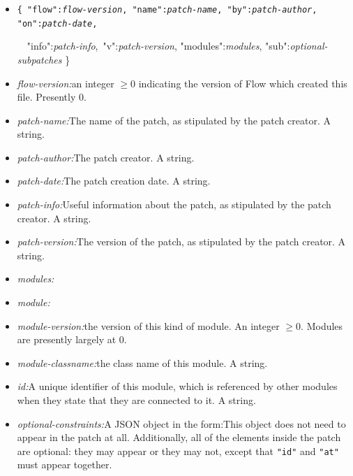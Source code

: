 \documentclass{article}
\begin{document}
\begin{itemize}
\item {\tt \{  "flow":{\it flow-version}, "name":{\it patch-name}, "by":{\it patch-author}, "on":{\it patch-date}, \rule[0in]{0in}{0in}~\hspace{\fill}\hbox{ "info":{\it patch-info}, "v":{\it patch-version},}  "modules":{\it modules}, "sub":{\it optional-subpatches} \} }
\item {\it flow-version:}\quad an integer \(\geq 0\) indicating the version of Flow which created this file.  Presently 0. 
\item {\it patch-name:}\quad The name of the patch, as stipulated by the patch creator.  A string. 
\item {\it patch-author:}\quad The patch creator.  A string.  
\item {\it patch-date:}\quad The patch creation date.  A string.  
\item {\it patch-info:}\quad Useful information about the patch, as stipulated by the patch creator.  A string.  
\item {\it patch-version:}\quad The version of the patch, as stipulated by the patch creator.  A string. 
\item {\it modules:}\quad {\tt [ {\it module,*} ] }
\item {\it module:}
\item {\it module-version:}\quad the version of this kind of module.  An integer \(\geq 0\).  Modules are presently largely at 0.
\item {\it module-classname:}\quad the class name of this module.  A string.
\item {\it id:}\quad A unique identifier of this module, which is referenced by other modules when they state that they are connected to it.  A string.
\item {\it optional-constraints:}\quad A JSON object in the form:\quad  This object does not need to appear in the patch at all.  Additionally, all of the elements inside the patch are optional: they may appear or they may not, except that {\tt "id"} and {\tt "at"} must appear together.

\end{itemize}
\end{document}
